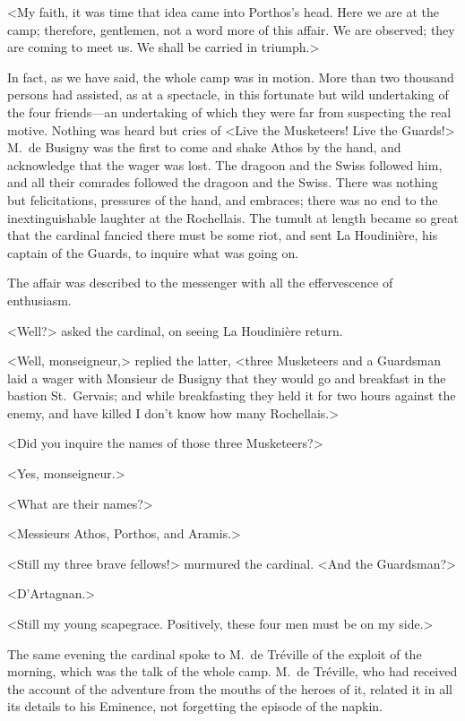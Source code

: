 <My faith, it was time that idea came into Porthos's head. Here we are at the camp; therefore, gentlemen, not a word more of this affair. We are observed; they are coming to meet us. We shall be carried in triumph.> 

In fact, as we have said, the whole camp was in motion. More than two thousand persons had assisted, as at a spectacle, in this fortunate but wild undertaking of the four friends—an undertaking of which they were far from suspecting the real motive. Nothing was heard but cries of <Live the Musketeers! Live the Guards!> M.~de Busigny was the first to come and shake Athos by the hand, and acknowledge that the wager was lost. The dragoon and the Swiss followed him, and all their comrades followed the dragoon and the Swiss. There was nothing but felicitations, pressures of the hand, and embraces; there was no end to the inextinguishable laughter at the Rochellais. The tumult at length became so great that the cardinal fancied there must be some riot, and sent La Houdinière, his captain of the Guards, to inquire what was going on. 

The affair was described to the messenger with all the effervescence of enthusiasm. 

<Well?> asked the cardinal, on seeing La Houdinière return. 

<Well, monseigneur,> replied the latter, <three Musketeers and a Guardsman laid a wager with Monsieur de Busigny that they would go and breakfast in the bastion St.~Gervais; and while breakfasting they held it for two hours against the enemy, and have killed I don't know how many Rochellais.> 

<Did you inquire the names of those three Musketeers?> 

<Yes, monseigneur.> 

<What are their names?> 

<Messieurs Athos, Porthos, and Aramis.> 

<Still my three brave fellows!> murmured the cardinal. <And the Guardsman?> 

<D'Artagnan.> 

<Still my young scapegrace. Positively, these four men must be on my side.> 

The same evening the cardinal spoke to M.~de Tréville of the exploit of the morning, which was the talk of the whole camp. M.~de Tréville, who had received the account of the adventure from the mouths of the heroes of it, related it in all its details to his Eminence, not forgetting the episode of the napkin. 

